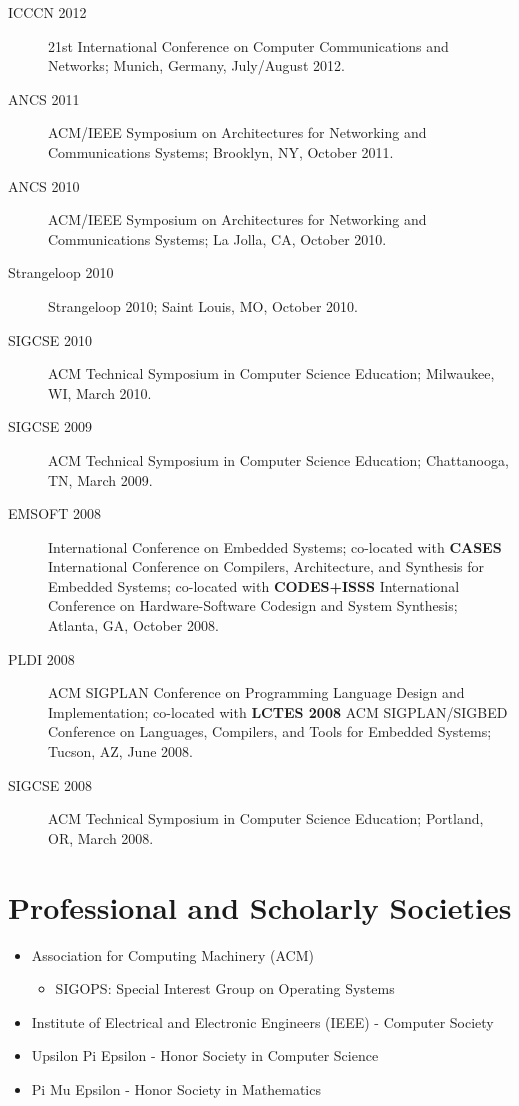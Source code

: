 \documentclass[12pt]{article}
\begin{document}
\begin{description}
    \item[ICCCN 2012] 21st International Conference on Computer
    Communications and Networks; Munich, Germany, July/August 2012.

    \item[ANCS 2011] ACM/IEEE Symposium on Architectures for Networking and
    Communications Systems; Brooklyn, NY, October 2011.

    \item[ANCS 2010] ACM/IEEE Symposium on Architectures for Networking and
    Communications Systems; La Jolla, CA, October 2010.

    \item[Strangeloop 2010] Strangeloop 2010; Saint Louis, MO, October
    2010.

	\item[SIGCSE 2010] ACM Technical Symposium in Computer Science
	Education; Milwaukee, WI, March 2010.

	\item[SIGCSE 2009] ACM Technical Symposium in Computer Science
	Education; Chattanooga, TN, March 2009.

	\item[EMSOFT 2008] International Conference on Embedded Systems;
	co-located with {\bf CASES} International Conference on Compilers,
	Architecture, and Synthesis for Embedded Systems; co-located with {\bf
	CODES+ISSS} International Conference on Hardware-Software Codesign and
	System Synthesis; Atlanta, GA, October 2008.

	\item[PLDI 2008] ACM SIGPLAN Conference on Programming Language Design
	and Implementation; co-located with {\bf LCTES 2008} ACM SIGPLAN/SIGBED
	Conference on Languages, Compilers, and Tools for Embedded Systems;
	Tucson, AZ, June 2008.

	\item[SIGCSE 2008] ACM Technical Symposium in Computer Science
	Education; Portland, OR, March 2008.
\end{description}

\section*{Professional and Scholarly Societies}
\begin{itemize}
	\item Association for Computing Machinery (ACM)
	\begin{itemize}
		\item SIGOPS: Special Interest Group on Operating Systems
	\end{itemize}
	\item Institute of Electrical and Electronic Engineers (IEEE) -
	Computer Society
	\item Upsilon Pi Epsilon - Honor Society in Computer Science
	\item Pi Mu Epsilon - Honor Society in Mathematics
\end{itemize}
\end{document}
